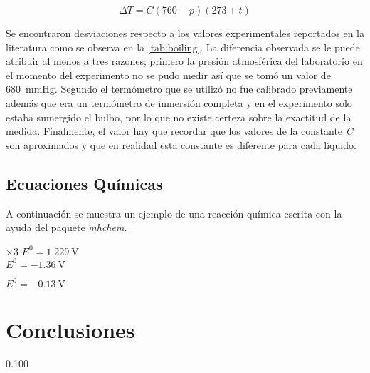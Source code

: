 \documentclass[12pt,letterpaper]{article}
\begin{document}
\begin{equation}
\label{eq:bpcorrection}
\Delta T = C(760 - p)(273 + t)
\end{equation}

Se encontraron desviaciones respecto a los valores experimentales reportados en la literatura como se observa en la \ref{tab:boiling}. La diferencia observada se le puede atribuir al menos a tres razones; primero la presión atmosférica del laboratorio en el momento del experimento no se pudo medir así que se tomó un valor de \SI{680}{\mmHg}. Segundo el termómetro que se utilizó no fue calibrado previamente además que era un termómetro de inmersión completa y en el experimento solo estaba sumergido el bulbo, por lo que no existe certeza sobre la exactitud de la medida. Finalmente, el valor hay que recordar que los valores de la constante \textit{C} son aproximados y que en realidad esta constante es diferente para cada líquido.

\subsection{Ecuaciones Químicas}

A continuación se muestra un ejemplo de una reacción química escrita con la ayuda del paquete \textit{mhchem}.

\begin{center}
 \hspace{19mm} $\times 3$ \hspace{20mm} $E^0 = \SI{1.229}{\volt}$\\
\vspace{3mm}
 \hspace{24mm} $E^0 = \SI{-1.36}{\volt}$\\
\underline{\hspace{145mm}}

 \hspace{15mm} $E^0 = \SI{-0.13}{\volt}$\\
\end{center}

\section{Conclusiones\label{sec:conclusions}}

\SI{0.100}{\Molar} \\
\end{document}
